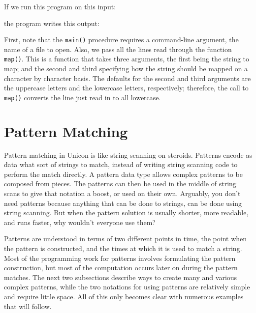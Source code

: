 \noindent If we run this program on this input: 


\noindent the program writes this output: 


First, note that the \texttt{main()} procedure requires a command-line
argument, the name of a file to open. Also, we pass all the lines read
through the function \texttt{map()}. This is a function that takes
three arguments, the first being the string to map; and the second and
third specifying how the string should be mapped on a character by
character basis. The defaults for the second and third arguments are
the uppercase letters and the lowercase letters, respectively;
therefore, the call to \texttt{map()} converts the line just read in to
all lowercase.

\section{Pattern Matching}

Pattern matching in Unicon is like string scanning on steroids.
Patterns encode as data what sort of strings to match, instead of writing
string scanning code to perform the match directly.  A
pattern data type allows complex patterns to be composed from pieces.
The patterns can then be used in the middle of string scans to give
that notation a boost, or used on their own. Arguably, you don't need
patterns because anything that can be done to strings, can be done
using string scanning. But when the pattern solution is usually
shorter, more readable, and runs faster, why wouldn't everyone use them?

Patterns are understood in terms of two different points in time, the
point when the pattern is constructed, and the times at which it is
used to match a string.  Most of the programming work for patterns
involves formulating the pattern construction, but most of the
computation occurs later on during the pattern matches.
The next two subsections describe ways to
create many and various complex patterns, while the two notations for
using patterns are relatively simple and require little space.  All of
this only becomes clear with numerous examples that will follow.


